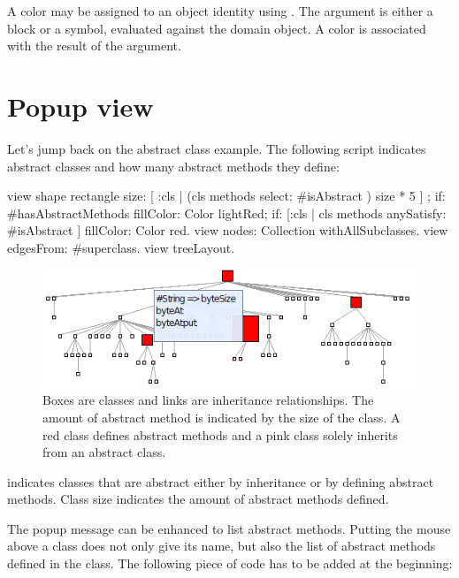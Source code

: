 \documentclass[a4paper,10pt,twoside]{book}
\begin{document}
A color may be assigned to an object identity using . The argument is either a block or a symbol, evaluated against the domain object. A color is associated with the result of the argument.


\section{Popup view}

Let's jump back on the abstract class example. The following script indicates abstract classes and how many abstract methods they define:

\begin{code}{}
view shape rectangle
	size: [ :cls | (cls methods select:  #isAbstract ) size * 5 ] ;
	if: #hasAbstractMethods fillColor: Color lightRed;
	if: [:cls | cls methods anySatisfy: #isAbstract ] fillColor: Color red.
view nodes: Collection withAllSubclasses.
view edgesFrom: #superclass.
view treeLayout.
\end{code}

\begin{figure}[htbp]
\centerline{\includegraphics[width=0.6\linewidth]{abstractClasses2.png}}
\caption{Boxes are classes and links are inheritance relationships. The amount of abstract method is indicated by the size of the class. A red class defines abstract methods and a pink class solely inherits from an abstract class.}
\label{fig:abstractClasses2}
\end{figure}

 indicates classes that are abstract either by inheritance or by defining abstract methods. Class size indicates the amount of abstract methods defined. 

The popup message can be enhanced to list abstract methods. Putting the mouse above a class does not only give its name, but also the list of abstract methods defined in the class. The following piece of code has to be added at the beginning:

\end{document}
